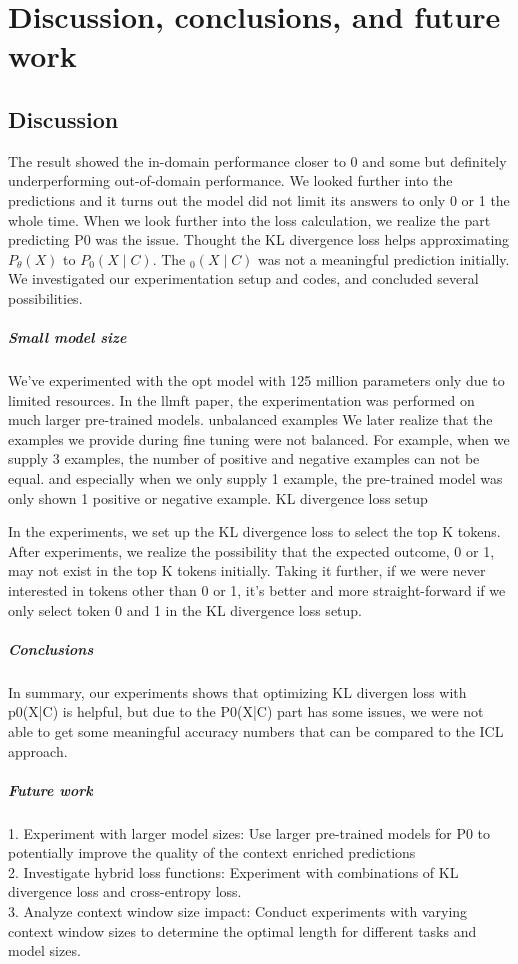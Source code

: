 \documentclass[10pt,twocolumn,letterpaper]{article}
\begin{document}
\section{Discussion, conclusions, and future work}
\subsection*{Discussion}
The result showed the in-domain performance closer to 0 and some but definitely underperforming out-of-domain performance. We looked further into the predictions and it turns out the model did not limit its answers to only 0 or 1 the whole time. When we look further into the loss calculation, we realize the part predicting P0 was the issue. Thought the KL divergence loss helps approximating $P_\theta(X)$ to $P_0(X\mid C)$. The $_0(X\mid C)$ was not a meaningful prediction initially.
We investigated our experimentation setup and codes, and concluded several possibilities.
\subparagraph*{Small model size}
We’ve experimented with the opt model with 125 million parameters only due to limited resources. In the llmft paper, the experimentation was performed on much larger pre-trained models.
unbalanced examples 
We later realize that the examples we provide during fine tuning were not balanced. For example, when we supply 3 examples, the number of positive and negative examples can not be equal. and especially when we only supply 1 example, the pre-trained model was only shown 1 positive or negative example. 
KL divergence loss setup

In the experiments, we set up the KL divergence loss to select the top K tokens. After experiments, we realize the possibility that the expected outcome, 0 or 1, may not exist in the top K tokens initially. Taking it further, if we were never interested in tokens other than 0 or 1, it’s better and more straight-forward if we only select token 0 and 1 in the KL divergence loss setup.

\subparagraph*{Conclusions}
In summary, our experiments shows that  optimizing KL divergen loss with p0(X|C) is helpful, but due to the P0(X|C) part has some issues, we were not able to get some meaningful accuracy numbers that can be compared to the ICL approach.

\subparagraph*{Future work}
1. Experiment with larger model sizes: Use larger pre-trained models for P0 to potentially improve the quality of the context enriched predictions\\
2. Investigate hybrid loss functions: Experiment with combinations of KL divergence loss and cross-entropy loss.\\
3. Analyze context window size impact: Conduct experiments with varying context window sizes to determine the optimal length for different tasks and model sizes.
\end{document}

